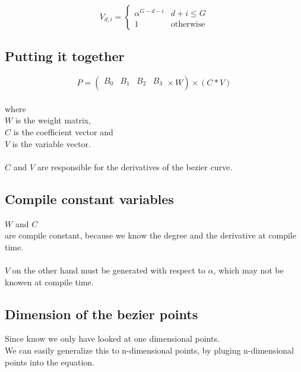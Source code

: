\begin{equation*}
    V_{d,i}=\begin{cases}
        \alpha^{G - d - i} & d + i \le G      \\
        1                  & \text{otherwise}
    \end{cases}
\end{equation*}

\subsection{Putting it together}

\begin{equation*}
    P=
    \left(
    \begin{array}{cccc}
        B_0 & B_1 & B_2 & B_3 \\
    \end{array}
    \times
    W
    \right)
    \times
    \left(
    C
    *
    V
    \right)
\end{equation*}
\\
where
\\
$W$ is the weight matrix,\\
$C$ is the coefficient vector and\\
$V$ is the variable vector.\\
\\
$C$ and $V$ are responsible for the derivatives of the bezier curve.

\subsection{Compile constant variables}

$W$ and $C$ \\
are compile constant, because we know the degree and the derivative at compile time.
\\\\
$V$ on the other hand must be generated with respect to $\alpha$, which may not be knowen at compile time.

\subsection{Dimension of the bezier points}

Since know we only have looked at one dimensional points.\\
We can easily generalize this to n-dimensional points, by pluging n-dimensional points into the equation.


